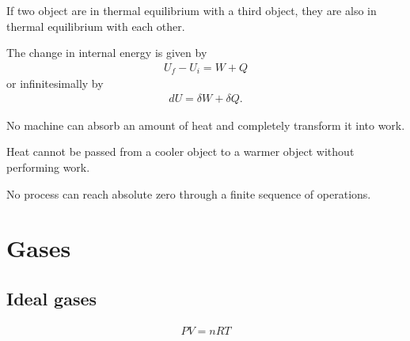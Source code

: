     \begin{theorem}
        If two object are in thermal equilibrium with a third object, they are also in thermal equilibrium with each other.
    \end{theorem}
    \begin{theorem}
        The change in internal energy is given by
        \begin{gather}
            \label{thermo:first_law}
            U_f - U_i = W + Q
        \end{gather}
        or infinitesimally by
        \begin{gather}
            \label{thermo:first_law_differential}
            dU = \delta W + \delta Q.
        \end{gather}
    \end{theorem}

    \begin{theorem}
        No machine can absorb an amount of heat and completely transform it into work.
    \end{theorem}
    \begin{theorem}
        Heat cannot be passed from a cooler object to a warmer object without performing work.
    \end{theorem}


    \begin{theorem}
        No process can reach absolute zero through a finite sequence of operations.
    \end{theorem}

\section{Gases}
\subsection{Ideal gases}

    \begin{theorem}
        \begin{gather}
            \label{thermo:ideal_gas_law}
            PV = nRT
        \end{gather}
    \end{theorem}